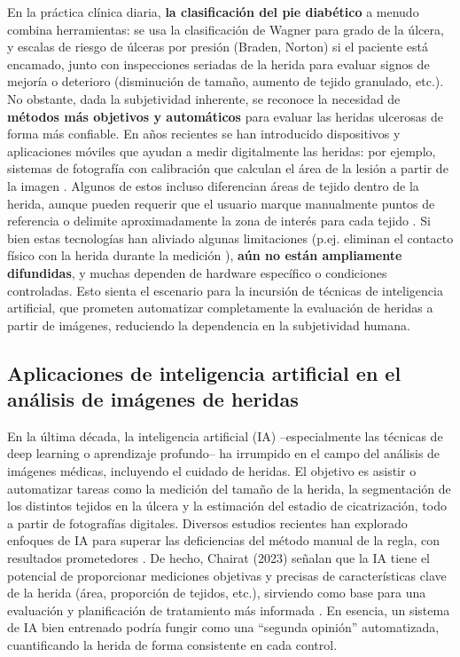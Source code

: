 En la práctica clínica diaria, \textbf{la clasificación del pie diabético} a menudo combina herramientas: se usa la clasificación de Wagner para grado de la úlcera, y escalas de riesgo de úlceras por presión (Braden, Norton) si el paciente está encamado, junto con inspecciones seriadas de la herida para evaluar signos de mejoría o deterioro (disminución de tamaño, aumento de tejido granulado, etc.). No obstante, dada la subjetividad inherente, se reconoce la necesidad de \textbf{métodos más objetivos y automáticos} para evaluar las heridas ulcerosas de forma más confiable. En años recientes se han introducido dispositivos y aplicaciones móviles que ayudan a medir digitalmente las heridas: por ejemplo, sistemas de fotografía con calibración que calculan el área de la lesión a partir de la imagen
. Algunos de estos incluso diferencian áreas de tejido dentro de la herida, aunque pueden requerir que el usuario marque manualmente puntos de referencia o delimite aproximadamente la zona de interés para cada tejido
. Si bien estas tecnologías han aliviado algunas limitaciones (p.ej. eliminan el contacto físico con la herida durante la medición
), \textbf{aún no están ampliamente difundidas}, y muchas dependen de hardware específico o condiciones controladas. Esto sienta el escenario para la incursión de técnicas de inteligencia artificial, que prometen automatizar completamente la evaluación de heridas a partir de imágenes, reduciendo la dependencia en la subjetividad humana.

\subsection{Aplicaciones de inteligencia artificial en el análisis de imágenes de heridas}

En la última década, la inteligencia artificial (IA) –especialmente las técnicas de deep learning o aprendizaje profundo– ha irrumpido en el campo del análisis de imágenes médicas, incluyendo el cuidado de heridas. El objetivo es asistir o automatizar tareas como la medición del tamaño de la herida, la segmentación de los distintos tejidos en la úlcera y la estimación del estadio de cicatrización, todo a partir de fotografías digitales. Diversos estudios recientes han explorado enfoques de IA para superar las deficiencias del método manual de la regla, con resultados prometedores
. De hecho, Chairat  (2023) señalan que la IA tiene el potencial de proporcionar mediciones objetivas y precisas de características clave de la herida (área, proporción de tejidos, etc.), sirviendo como base para una evaluación y planificación de tratamiento más informada
. En esencia, un sistema de IA bien entrenado podría fungir como una “segunda opinión” automatizada, cuantificando la herida de forma consistente en cada control.

